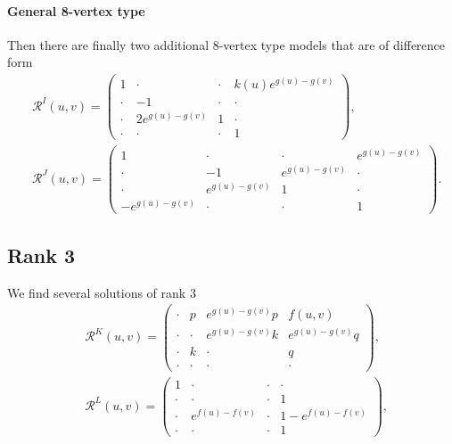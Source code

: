 \documentclass{article}
\begin{document}
\paragraph{General 8-vertex type}
Then there are finally two additional 8-vertex type models that are of difference form
\begin{align}
    &
    \mathcal{R}^I(u,v)= \begin{pmatrix}
        1&\cdot&\cdot&k(u) e^{g(u)-g(v)}\\
        \cdot&-1&\cdot&\cdot\\
        \cdot&2 e^{g(u)-g(v)}&1&\cdot\\
        \cdot&\cdot&\cdot&1
    \end{pmatrix},\\
    &
    \mathcal{R}^J(u,v)= \begin{pmatrix}
        1&\cdot&\cdot&e^{g(u)-g(v)}\\
        \cdot&-1&e^{g(u)-g(v)}&\cdot\\
        \cdot&e^{g(u)-g(v)}&1&\cdot\\
        -e^{g(u)-g(v)}&\cdot&\cdot&1
    \end{pmatrix}.
      \label{R^J(u,v)}
\end{align}


\subsection{Rank 3}

We find several  solutions of rank 3
\begin{align}
   &  \mathcal{R}^K(u,v)=\begin{pmatrix}
       \cdot&p&  e^{g(u)-g(v)} p&f(u,v)\\
        \cdot&\cdot&e^{g(u)-g(v)}k&e^{g(u)-g(v)} q\\
        \cdot&k&\cdot&q\\
        \cdot&\cdot&\cdot&\cdot
    \end{pmatrix},\\
 &  \mathcal{R}^L(u,v)=\begin{pmatrix}
       1&\cdot&\cdot&\cdot\\
        \cdot&\cdot&\cdot&1\\
        \cdot&e^{f(u)-f(v)}&\cdot&1-e^{f(u)-f(v)}\\
        \cdot&\cdot&\cdot&1
    \end{pmatrix},
\end{align}
\end{document}
